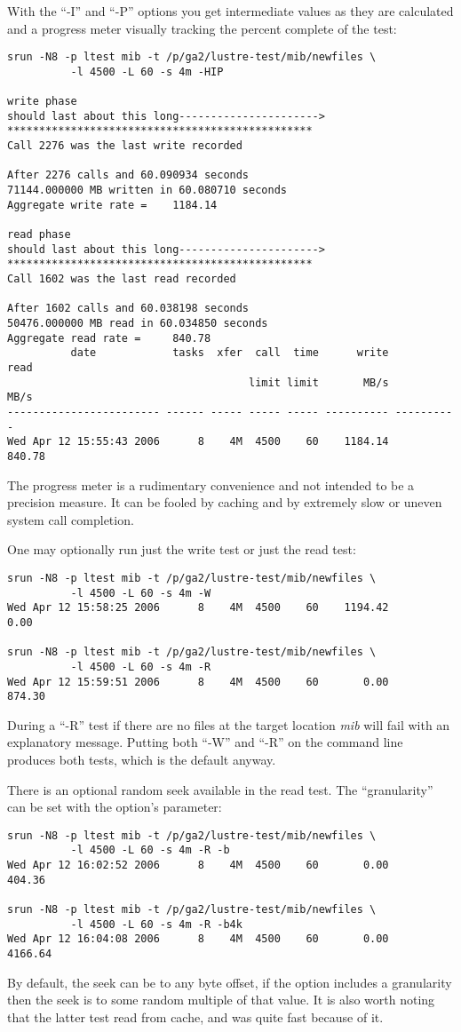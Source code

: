 \documentclass{article}
\begin{document}
\pagebreak
With the ``-I'' and ``-P'' options you get intermediate values as they
are calculated and a progress meter visually tracking the percent
complete of the test:
{\small
  \begin{verbatim}
srun -N8 -p ltest mib -t /p/ga2/lustre-test/mib/newfiles \
          -l 4500 -L 60 -s 4m -HIP

write phase
should last about this long---------------------->
************************************************
Call 2276 was the last write recorded

After 2276 calls and 60.090934 seconds
71144.000000 MB written in 60.080710 seconds
Aggregate write rate =    1184.14

read phase
should last about this long---------------------->
************************************************
Call 1602 was the last read recorded

After 1602 calls and 60.038198 seconds
50476.000000 MB read in 60.034850 seconds
Aggregate read rate =     840.78
          date            tasks  xfer  call  time      write       read
                                      limit limit       MB/s       MB/s
------------------------ ------ ----- ----- ----- ---------- ----------
Wed Apr 12 15:55:43 2006      8    4M  4500    60    1184.14     840.78
  \end{verbatim}
}
The progress meter is a rudimentary convenience and not intended to be
a precision measure.  It can be fooled by caching and by extremely
slow or uneven system call completion.

One may optionally run just the write test or just the read test:
{\small
  \begin{verbatim}
srun -N8 -p ltest mib -t /p/ga2/lustre-test/mib/newfiles \
          -l 4500 -L 60 -s 4m -W  
Wed Apr 12 15:58:25 2006      8    4M  4500    60    1194.42       0.00

srun -N8 -p ltest mib -t /p/ga2/lustre-test/mib/newfiles \
          -l 4500 -L 60 -s 4m -R
Wed Apr 12 15:59:51 2006      8    4M  4500    60       0.00     874.30
  \end{verbatim}
}
During a ``-R'' test if there are no files at the target location {\em
mib} will fail with an explanatory message.  Putting both ``-W'' and
``-R'' on the command line produces both tests, which is the default
anyway.

\pagebreak
There is an optional random seek available in the read test.  The
``granularity'' can be set with the option's parameter:
{\small
  \begin{verbatim}
srun -N8 -p ltest mib -t /p/ga2/lustre-test/mib/newfiles \
          -l 4500 -L 60 -s 4m -R -b
Wed Apr 12 16:02:52 2006      8    4M  4500    60       0.00     404.36

srun -N8 -p ltest mib -t /p/ga2/lustre-test/mib/newfiles \
          -l 4500 -L 60 -s 4m -R -b4k
Wed Apr 12 16:04:08 2006      8    4M  4500    60       0.00    4166.64
  \end{verbatim}
}
By default, the seek can be to any byte offset, if the option includes
a granularity then the seek is to some random multiple of that
value.  It is also worth noting that the latter test read from cache,
and was quite fast because of it.
\end{document}
